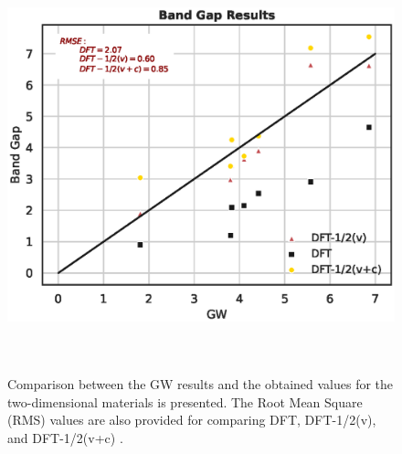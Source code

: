 \begin{figure}[!ht]
        \centering
        \includegraphics[width=16cm,height=12cm]{images/2d_comparison.eps}
        \caption{Comparison between the GW results and the obtained values for the two-dimensional materials is presented. The Root Mean Square (RMS) values are also provided for comparing DFT, DFT-1/2(v), and DFT-1/2(v+c) .}
        \label{fig:2d_comparison}
\end{figure}

